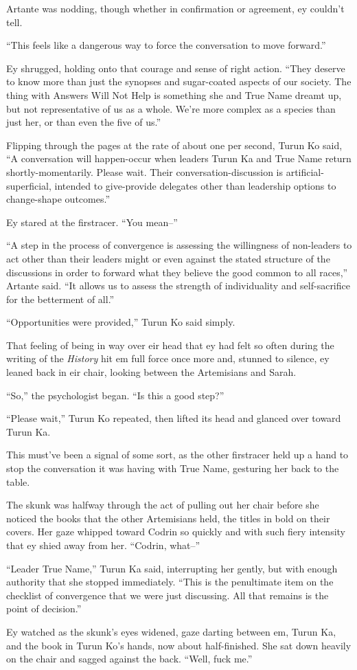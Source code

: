 Artante was nodding, though whether in confirmation or agreement, ey couldn't tell.

``This feels like a dangerous way to force the conversation to move forward.''

Ey shrugged, holding onto that courage and sense of right action. ``They deserve to know more than just the synopses and sugar-coated aspects of our society. The thing with Answers Will Not Help is something she and True Name dreamt up, but not representative of us as a whole. We're more complex as a species than just her, or than even the five of us.''

Flipping through the pages at the rate of about one per second, Turun Ko said, ``A conversation will happen-occur when leaders Turun Ka and True Name return shortly-momentarily. Please wait. Their conversation-discussion is artificial-superficial, intended to give-provide delegates other than leadership options to change-shape outcomes.''

Ey stared at the firstracer. ``You mean--''

``A step in the process of convergence is assessing the willingness of non-leaders to act other than their leaders might or even against the stated structure of the discussions in order to forward what they believe the good common to all races,'' Artante said. ``It allows us to assess the strength of individuality and self-sacrifice for the betterment of all.''

``Opportunities were provided,'' Turun Ko said simply.

That feeling of being in way over eir head that ey had felt so often during the writing of the \emph{History} hit em full force once more and, stunned to silence, ey leaned back in eir chair, looking between the Artemisians and Sarah.

``So,'' the psychologist began. ``Is this a good step?''

``Please wait,'' Turun Ko repeated, then lifted its head and glanced over toward Turun Ka.

This must've been a signal of some sort, as the other firstracer held up a hand to stop the conversation it was having with True Name, gesturing her back to the table.

The skunk was halfway through the act of pulling out her chair before she noticed the books that the other Artemisians held, the titles in bold on their covers. Her gaze whipped toward Codrin so quickly and with such fiery intensity that ey shied away from her. ``Codrin, what--''

``Leader True Name,'' Turun Ka said, interrupting her gently, but with enough authority that she stopped immediately. ``This is the penultimate item on the checklist of convergence that we were just discussing. All that remains is the point of decision.''

Ey watched as the skunk's eyes widened, gaze darting between em, Turun Ka, and the book in Turun Ko's hands, now about half-finished. She sat down heavily on the chair and sagged against the back. ``Well, fuck me.''
